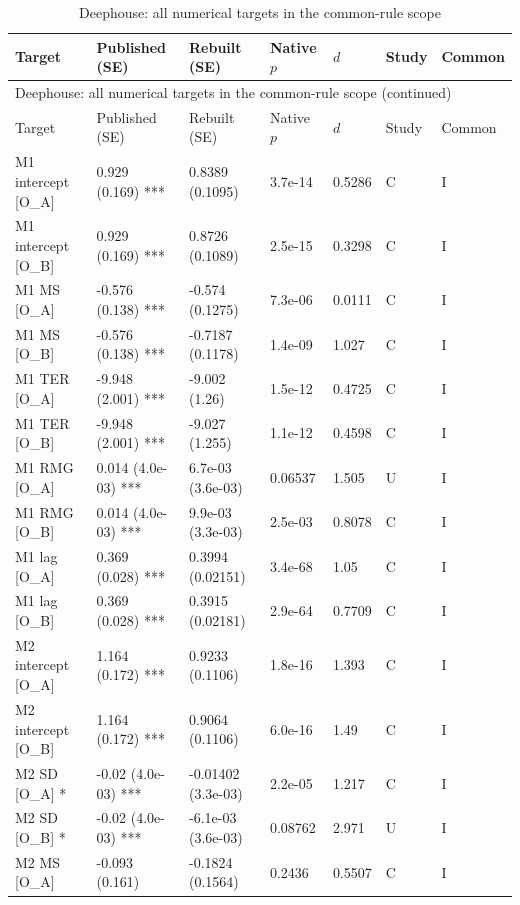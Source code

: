 {\scriptsize\setlength{\tabcolsep}{3pt}\renewcommand{\arraystretch}{1.06}
\begin{longtable}{@{}p{.245\linewidth}p{.17\linewidth}p{.17\linewidth}p{.085\linewidth}p{.060\linewidth}p{.08\linewidth}p{.07\linewidth}@{}}
\caption{Deephouse: all numerical targets in the common-rule scope}\label{tab:all:deephouse1999}\\
\toprule Target & Published (SE) & Rebuilt (SE) & Native $p$ & $d$ & Study & Common\\\midrule
\endfirsthead\multicolumn{7}{l}{\small Deephouse: all numerical targets in the common-rule scope (continued)}\\\toprule Target & Published (SE) & Rebuilt (SE) & Native $p$ & $d$ & Study & Common\\\midrule\endhead\bottomrule\endfoot
M1 intercept [O\_A] & 0.929 (0.169) *** & 0.8389 (0.1095) & 3.7e-14 & 0.5286 & C & I\\
M1 intercept [O\_B] & 0.929 (0.169) *** & 0.8726 (0.1089) & 2.5e-15 & 0.3298 & C & I\\
M1 MS [O\_A] & -0.576 (0.138) *** & -0.574 (0.1275) & 7.3e-06 & 0.0111 & C & I\\
M1 MS [O\_B] & -0.576 (0.138) *** & -0.7187 (0.1178) & 1.4e-09 & 1.027 & C & I\\
M1 TER [O\_A] & -9.948 (2.001) *** & -9.002 (1.26) & 1.5e-12 & 0.4725 & C & I\\
M1 TER [O\_B] & -9.948 (2.001) *** & -9.027 (1.255) & 1.1e-12 & 0.4598 & C & I\\
M1 RMG [O\_A] & 0.014 (4.0e-03) *** & 6.7e-03 (3.6e-03) & 0.06537 & 1.505 & U & I\\
M1 RMG [O\_B] & 0.014 (4.0e-03) *** & 9.9e-03 (3.3e-03) & 2.5e-03 & 0.8078 & C & I\\
M1 lag [O\_A] & 0.369 (0.028) *** & 0.3994 (0.02151) & 3.4e-68 & 1.05 & C & I\\
M1 lag [O\_B] & 0.369 (0.028) *** & 0.3915 (0.02181) & 2.9e-64 & 0.7709 & C & I\\
M2 intercept [O\_A] & 1.164 (0.172) *** & 0.9233 (0.1106) & 1.8e-16 & 1.393 & C & I\\
M2 intercept [O\_B] & 1.164 (0.172) *** & 0.9064 (0.1106) & 6.0e-16 & 1.49 & C & I\\
M2 SD [O\_A] * & -0.02 (4.0e-03) *** & -0.01402 (3.3e-03) & 2.2e-05 & 1.217 & C & I\\
M2 SD [O\_B] * & -0.02 (4.0e-03) *** & -6.1e-03 (3.6e-03) & 0.08762 & 2.971 & U & I\\
M2 MS [O\_A] & -0.093 (0.161) & -0.1824 (0.1564) & 0.2436 & 0.5507 & C & I\\

\end{longtable}}
